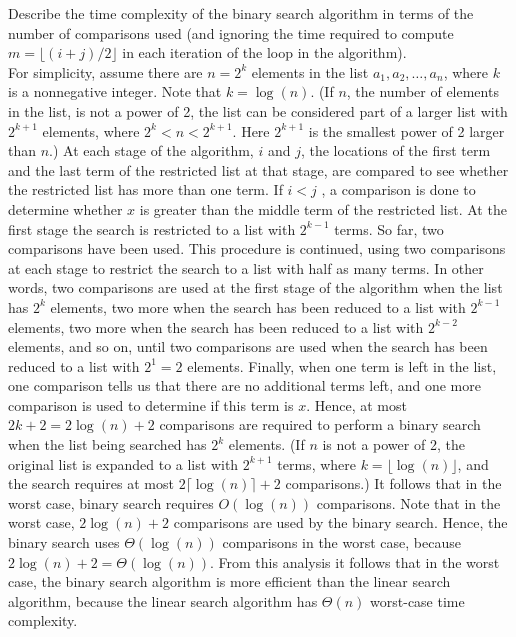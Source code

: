 \documentclass[12pt]{article}
\begin{document}
\begin{example} Describe the time complexity of the binary search algorithm in terms of the number of comparisons used (and ignoring the time required to compute $m = \lfloor (i + j)/2 \rfloor $ in each iteration of the loop in the algorithm). \\ 
For simplicity, assume there are $n = 2^k$ elements in the list $a_1, a_2,\dots, a_n$, where $k$ is a nonnegative integer. Note that $k = \log(n)$. (If $n$, the number of elements in the list, is not a power of 2, the list can be considered part of a larger list with $2^{k+1}$ elements, where $2^k < n < 2^{k+1}$. Here $2^{k+1}$ is the smallest power of 2 larger than $n$.) At each stage of the algorithm, $i$ and $j$, the locations of the first term and the last term of the restricted list at that stage, are compared to see whether the restricted list has more than one term. If $i < j$ , a comparison is done to determine whether $x$ is greater than the middle term of the restricted list. At the first stage the search is restricted to a list with $2^{k - 1}$ terms. So far, two comparisons have been used. This procedure is continued, using two comparisons at each stage to restrict the search to a list with half as many terms. In other words, two comparisons are used at the first stage of the algorithm when the list has $2^k$ elements, two more when the search has been reduced to a list with $2^{k - 1}$ elements, two more when the search has been reduced to a list with $2^{k - 2}$ elements, and so on, until two comparisons are used when the search has been reduced to a list with $2^1 = 2$ elements. Finally, when one term is left in the list, one comparison tells us that there are no additional terms left, and one more comparison is used to determine if this term is $x$. Hence, at most $2k + 2 = 2\log(n) + 2$ comparisons are required to perform a binary search when the list being searched has $2^k$ elements. (If $n$ is not a power of 2, the original list is expanded to a list with $2^{k + 1}$ terms, where $k = \lfloor \log(n)\rfloor$, and the search requires at most $2\lceil \log(n)\rceil + 2$ comparisons.) It follows that in the worst case, binary search requires $O(\log(n))$ comparisons. Note that in the worst case, $2\log(n) + 2$ comparisons are used by the binary search. Hence, the binary search uses $\Theta(\log(n))$ comparisons in the worst case, because $2\log(n) + 2 = \Theta(\log(n))$. From this analysis it follows that in the worst case, the binary search algorithm is more efficient than the linear search algorithm, because the linear search algorithm has $\Theta(n)$ worst-case time complexity.\end{example}
\end{document}
